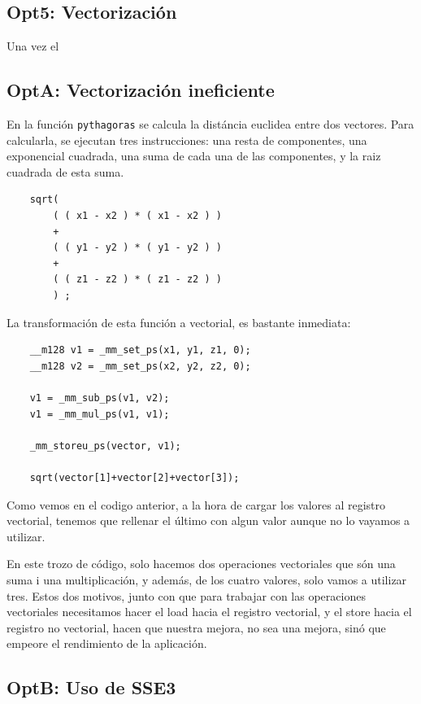 \subsection{Opt5: Vectorizaci\'{o}n}

Una vez el 


\subsection{OptA: Vectorizaci\'{o}n ineficiente}

En la funci\'{o}n \texttt{pythagoras} se calcula la dist\'{a}ncia euclidea
entre dos vectores. Para calcularla, se ejecutan tres instrucciones: una 
resta de componentes, una exponencial cuadrada, una suma de cada una de las
componentes, y la raiz cuadrada de esta suma.

\begin{lstlisting}
	sqrt( 
		( ( x1 - x2 ) * ( x1 - x2 ) ) 
		+ 
		( ( y1 - y2 ) * ( y1 - y2 ) ) 
		+ 
		( ( z1 - z2 ) * ( z1 - z2 ) ) 
		) ;
\end{lstlisting}

La transformaci\'{o}n de esta funci\'{o}n a vectorial, es bastante inmediata:

\begin{lstlisting}
	__m128 v1 = _mm_set_ps(x1, y1, z1, 0);
	__m128 v2 = _mm_set_ps(x2, y2, z2, 0);
	
	v1 = _mm_sub_ps(v1, v2);
	v1 = _mm_mul_ps(v1, v1);
	
	_mm_storeu_ps(vector, v1);
	
	sqrt(vector[1]+vector[2]+vector[3]);
\end{lstlisting}

Como vemos en el codigo anterior, a la hora de cargar los valores al
registro vectorial, tenemos que rellenar el \'{u}ltimo con algun valor
aunque no lo vayamos a utilizar.

En este trozo de c\'{o}digo, solo hacemos dos operaciones vectoriales
que s\'{o}n una suma i una multiplicaci\'{o}n, y adem\'{a}s, de los cuatro
valores, solo vamos a utilizar tres. Estos dos motivos, junto con que para
trabajar con las operaciones vectoriales necesitamos hacer el load hacia 
el registro vectorial, y el store hacia el registro no vectorial, hacen que
nuestra mejora, no sea una mejora, sin\'{o} que empeore el rendimiento de
la aplicaci\'{o}n.

\subsection{OptB: Uso de SSE3}


